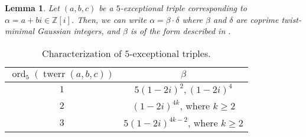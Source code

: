 \documentclass[12pt]{amsart}
\newcounter{counter}[section] %
\numberwithin{equation}{section} %
\newtheorem{lemma}[counter]{Lemma}
\theoremstyle{definition} \newtheorem{definition}[counter]{Definition}
\theoremstyle{remark} \newtheorem{nonexam}[counter]{Non-example}
\newcommand{\ZZ}{\mathbb{Z}} %
\DeclareMathOperator{\ord}{ord} %
\DeclareMathOperator{\twerr}{twerr} %
\begin{document}
\begin{lemma}
  Let $(a,b,c)$ be a $5$-exceptional triple corresponding to
  $\alpha = a+bi \in \ZZ[i]$. Then, we can write $\alpha = \beta\cdot\delta$
  where $\beta$ and $\delta$ are coprime twist-minimal Gaussian integers, and
  $\beta$ is of the form described in
  .
\end{lemma}
\begin{table}[ht]
    \begin{tabular}{|c|c|}
      \hline
      $\ord_5(\twerr(a,b,c))$ & $\beta$                 \\ \hline
      $1$   & $5(1 - 2i)^2, (1 - 2i)^4$              \\ \hline
      $2$   & $(1 - 2i)^{4k}$, where $k \geq 2$                         \\ \hline
      $3$   & $5(1 - 2i)^{4k-2}$, where $k \geq 2$                      \\ \hline
    \end{tabular}
    \caption{Characterization of $5$-exceptional triples.}
    \label{table:characterization-5-exceptional-triples}
\end{table}
\end{document}
